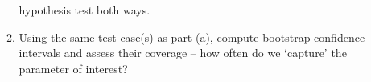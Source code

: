 \documentclass{article}\usepackage[]{graphicx}\usepackage[]{xcolor}
\begin{document}
\begin{enumerate}
\begin{enumerate}
hypothesis test both ways.
  \item Using the same test case(s) as part (a), compute bootstrap confidence 
  intervals and assess their coverage -- how often do we `capture' the parameter
of interest?
\end{enumerate}
\end{enumerate}

\end{document}
